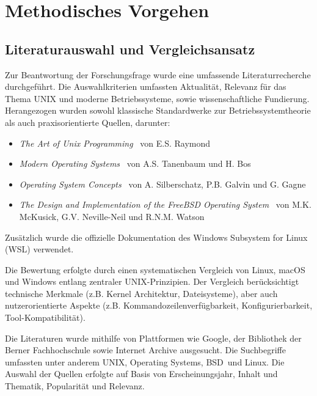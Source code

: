 \section{Methodisches Vorgehen}

\subsection{Literaturauswahl und Vergleichsansatz}

Zur Beantwortung der Forschungsfrage wurde eine umfassende Literaturrecherche durchgeführt. Die Auswahlkriterien umfassten Aktualität, Relevanz für das
Thema \glqq UNIX und moderne Betriebssysteme\grqq, sowie wissenschaftliche Fundierung. Herangezogen wurden sowohl klassische Standardwerke zur Betriebssystemtheorie
als auch praxisorientierte Quellen, darunter:

\begin{itemize}
	\setlength{\itemsep}{0pt}
	\item \textit{\glqq The Art of Unix Programming\grqq} \ von E.S. Raymond \cite{ArtOfUnixProgramming}
	\item \textit{\glqq Modern Operating Systems\grqq} \ von A.S. Tanenbaum und H. Bos \cite{ModernOS}
	\item \textit{\glqq Operating System Concepts\grqq} \ von A. Silberschatz, P.B. Galvin und G. Gagne \cite{OSConcept}
	\item \textit{\glqq The Design and Implementation of the FreeBSD Operating System\grqq} \ von M.K. McKusick, G.V. Neville-Neil und R.N.M. Watson \cite{FreeBSDOS}
\end{itemize}

Zusätzlich wurde die offizielle Dokumentation des Windows Subsystem for Linux (WSL) verwendet. \cite{WSL}

Die Bewertung erfolgte durch einen systematischen Vergleich von Linux, macOS und Windows entlang zentraler UNIX-Prinzipien. Der Vergleich berücksichtigt
technische Merkmale (z.B. Kernel Architektur, Dateisysteme), aber auch nutzerorientierte Aspekte (z.B. Kommandozeilenverfügbarkeit, Konfigurierbarkeit,
Tool-Kompatibilität).

Die Literaturen wurde mithilfe von Plattformen wie Google, der Bibliothek der Berner Fachhochschule sowie Internet Archive ausgesucht. Die Suchbegriffe umfassten
unter anderem \glqq UNIX\grqq, \glqq Operating Systems\grqq, \glqq BSD\grqq \ und \glqq Linux\grqq. Die Auswahl der Quellen erfolgte auf Basis von Erscheinungsjahr,
Inhalt und Thematik, Popularität und Relevanz.

